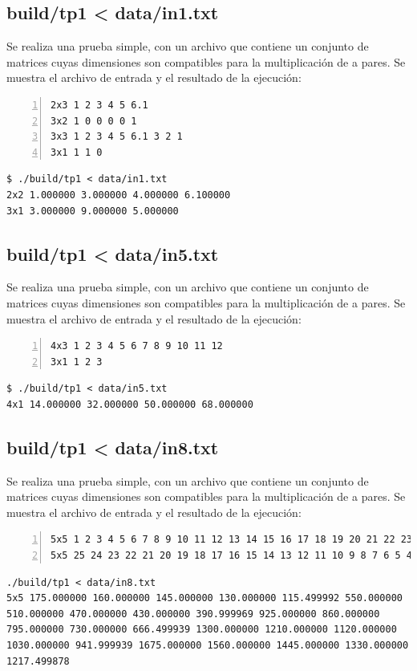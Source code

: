 \documentclass[a4paper,10pt]{article}
\begin{document}
\subsection{build/tp1 < data/in1.txt}
Se realiza una prueba simple, con un archivo que contiene un conjunto de matrices cuyas dimensiones son compatibles para la multiplicaci\'on de a pares. Se muestra el archivo de entrada y el resultado de la ejecuci\'on:

\begin{lstlisting}[numbers=left,language=bash]
2x3 1 2 3 4 5 6.1
3x2 1 0 0 0 0 1
3x3 1 2 3 4 5 6.1 3 2 1
3x1 1 1 0
\end{lstlisting}
\begin{lstlisting}
$ ./build/tp1 < data/in1.txt
2x2 1.000000 3.000000 4.000000 6.100000 
3x1 3.000000 9.000000 5.000000 
\end{lstlisting}

\subsection{build/tp1 < data/in5.txt}
Se realiza una prueba simple, con un archivo que contiene un conjunto de matrices cuyas dimensiones son compatibles para la multiplicaci\'on de a pares. Se muestra el archivo de entrada y el resultado de la ejecuci\'on:

\begin{lstlisting}[numbers=left,language=bash]
4x3 1 2 3 4 5 6 7 8 9 10 11 12
3x1 1 2 3
\end{lstlisting}
\begin{lstlisting}
$ ./build/tp1 < data/in5.txt
4x1 14.000000 32.000000 50.000000 68.000000 
\end{lstlisting}

\subsection{build/tp1 < data/in8.txt}
Se realiza una prueba simple, con un archivo que contiene un conjunto de matrices cuyas dimensiones son compatibles para la multiplicaci\'on de a pares. Se muestra el archivo de entrada y el resultado de la ejecuci\'on:

\begin{lstlisting}[numbers=left,language=bash]
5x5 1 2 3 4 5 6 7 8 9 10 11 12 13 14 15 16 17 18 19 20 21 22 23 24 25
5x5 25 24 23 22 21 20 19 18 17 16 15 14 13 12 11 10 9 8 7 6 5 4 3 2 1.1
\end{lstlisting}
\begin{lstlisting}
./build/tp1 < data/in8.txt
5x5 175.000000 160.000000 145.000000 130.000000 115.499992 550.000000 510.000000 470.000000 430.000000 390.999969 925.000000 860.000000 795.000000 730.000000 666.499939 1300.000000 1210.000000 1120.000000 1030.000000 941.999939 1675.000000 1560.000000 1445.000000 1330.000000 1217.499878
\end{lstlisting}
\end{document}
